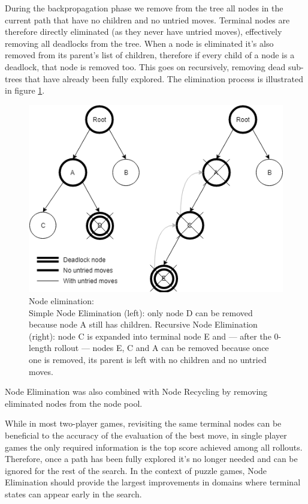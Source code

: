 \medskip\noindent
During the backpropagation phase we remove from the tree all nodes in the current path that have no children and no untried moves. Terminal nodes are therefore directly eliminated (as they never have untried moves), effectively removing all deadlocks from the tree. When a node is eliminated it's also removed from its parent's list of children, therefore if every child of a node is a deadlock, that node is removed too. This goes on recursively, removing dead sub-trees that have already been fully explored. The elimination process is illustrated in figure \ref{fig:nodeelimination}.
\begin{figure}[ht]
    \centering
    \includegraphics[width=0.9\linewidth]{pictures/NodeElimination.png}
        \caption[Node elimination]{Node elimination:\\
            Simple Node Elimination (left): only node D can be removed because node A still has children.
             Recursive Node Elimination (right): node C is expanded into terminal node E and --- after the 0-length rollout --- nodes E, C and A can be removed because once one is removed, its parent is left with no children and no untried moves.}
    \label{fig:nodeelimination}
\end{figure}
Node Elimination was also combined with Node Recycling by removing eliminated nodes from the node pool.

\medskip\noindent
While in most two-player games, revisiting the same terminal nodes can be beneficial to the accuracy of the evaluation of the best move, in single player games the only required information is the top score achieved among all rollouts. Therefore, once a path has been fully explored it's no longer needed and can be ignored for the rest of the search. In the context of puzzle games, Node Elimination should provide the largest improvements in domains where terminal states can appear early in the search.

